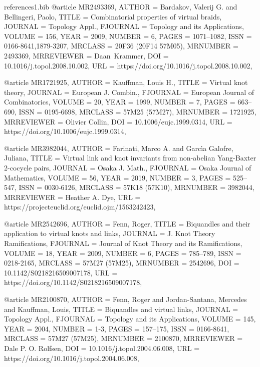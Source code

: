 \documentclass[11pt, reqno]{amsart}
\theoremstyle{definition}
\begin{document}
\begin{filecontents*}[overwrite]{references1.bib}
@article {MR2493369,
    AUTHOR = {Bardakov, Valerij G. and Bellingeri, Paolo},
     TITLE = {Combinatorial properties of virtual braids},
   JOURNAL = {Topology Appl.},
  FJOURNAL = {Topology and its Applications},
    VOLUME = {156},
      YEAR = {2009},
    NUMBER = {6},
     PAGES = {1071--1082},
      ISSN = {0166-8641,1879-3207},
   MRCLASS = {20F36 (20F14 57M05)},
  MRNUMBER = {2493369},
MRREVIEWER = {Daan\ Krammer},
       DOI = {10.1016/j.topol.2008.10.002},
       URL = {https://doi.org/10.1016/j.topol.2008.10.002},
}

@article {MR1721925,
	AUTHOR = {Kauffman, Louis H.},
	TITLE = {Virtual knot theory},
	JOURNAL = {European J. Combin.},
	FJOURNAL = {European Journal of Combinatorics},
	VOLUME = {20},
	YEAR = {1999},
	NUMBER = {7},
	PAGES = {663--690},
	ISSN = {0195-6698},
	MRCLASS = {57M25 (57M27)},
	MRNUMBER = {1721925},
	MRREVIEWER = {Olivier Collin},
	DOI = {10.1006/eujc.1999.0314},
	URL = {https://doi.org/10.1006/eujc.1999.0314},
}

@article {MR3982044,
    AUTHOR = {Farinati, Marco A. and Garc\'{\i}a Galofre, Juliana},
     TITLE = {Virtual link and knot invariants from non-abelian
              {Y}ang-{B}axter 2-cocycle pairs},
   JOURNAL = {Osaka J. Math.},
  FJOURNAL = {Osaka Journal of Mathematics},
    VOLUME = {56},
      YEAR = {2019},
    NUMBER = {3},
     PAGES = {525--547},
      ISSN = {0030-6126},
   MRCLASS = {57K18 (57K10)},
  MRNUMBER = {3982044},
MRREVIEWER = {Heather A. Dye},
       URL = {https://projecteuclid.org/euclid.ojm/1563242423},
}

@article {MR2542696,
    AUTHOR = {Fenn, Roger},
     TITLE = {Biquandles and their application to virtual knots and links},
   JOURNAL = {J. Knot Theory Ramifications},
  FJOURNAL = {Journal of Knot Theory and its Ramifications},
    VOLUME = {18},
      YEAR = {2009},
    NUMBER = {6},
     PAGES = {785--789},
      ISSN = {0218-2165},
   MRCLASS = {57M27 (57M25)},
  MRNUMBER = {2542696},
       DOI = {10.1142/S0218216509007178},
       URL = {https://doi.org/10.1142/S0218216509007178},
}

@article {MR2100870,
    AUTHOR = {Fenn, Roger and Jordan-Santana, Mercedes and Kauffman, Louis},
     TITLE = {Biquandles and virtual links},
   JOURNAL = {Topology Appl.},
  FJOURNAL = {Topology and its Applications},
    VOLUME = {145},
      YEAR = {2004},
    NUMBER = {1-3},
     PAGES = {157--175},
      ISSN = {0166-8641},
   MRCLASS = {57M27 (57M25)},
  MRNUMBER = {2100870},
MRREVIEWER = {Dale P. O. Rolfsen},
       DOI = {10.1016/j.topol.2004.06.008},
       URL = {https://doi.org/10.1016/j.topol.2004.06.008},
}


\end{filecontents*}
\end{document}
